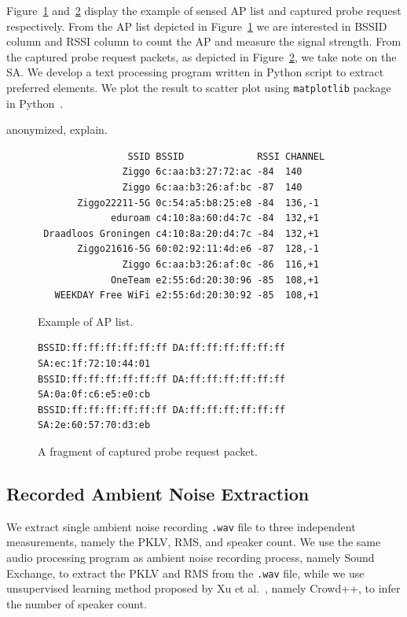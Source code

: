 Figure~\ref{fig:ap-list-example} and~\ref{fig:probe-request-example} display the example of sensed \ac{AP} list and captured probe request respectively. From the \ac{AP} list depicted in Figure~\ref{fig:ap-list-example} we are interested in \ac{BSSID} column and \ac{RSSI} column to count the \ac{AP} and measure the signal strength. From the captured probe request packets, as depicted in Figure~\ref{fig:probe-request-example}, we take note on the \ac{SA}. We develop a text processing program written in Python script to extract preferred elements. We plot the result to scatter plot using \verb|matplotlib| package in Python~\cite{Hunter:2007}.


anonymized, explain.

\begin{figure}[ht]
	\centering
\begin{verbatim}
                SSID BSSID             RSSI CHANNEL 
               Ziggo 6c:aa:b3:27:72:ac -84  140     
               Ziggo 6c:aa:b3:26:af:bc -87  140     
       Ziggo22211-5G 0c:54:a5:b8:25:e8 -84  136,-1  
             eduroam c4:10:8a:60:d4:7c -84  132,+1  
 Draadloos Groningen c4:10:8a:20:d4:7c -84  132,+1  
       Ziggo21616-5G 60:02:92:11:4d:e6 -87  128,-1  
               Ziggo 6c:aa:b3:26:af:0c -86  116,+1  
             OneTeam e2:55:6d:20:30:96 -85  108,+1  
   WEEKDAY Free WiFi e2:55:6d:20:30:92 -85  108,+1  
\end{verbatim}
	\caption{Example of \ac{AP} list.}
	\label{fig:ap-list-example}
\end{figure}

\begin{figure}[ht]
\centering
\begin{verbatim}
BSSID:ff:ff:ff:ff:ff:ff DA:ff:ff:ff:ff:ff:ff SA:ec:1f:72:10:44:01
BSSID:ff:ff:ff:ff:ff:ff DA:ff:ff:ff:ff:ff:ff SA:0a:0f:c6:e5:e0:cb
BSSID:ff:ff:ff:ff:ff:ff DA:ff:ff:ff:ff:ff:ff SA:2e:60:57:70:d3:eb
\end{verbatim}
\caption{A fragment of captured probe request packet.}
\label{fig:probe-request-example}
\end{figure}

\subsection{Recorded Ambient Noise Extraction} %
\label{sub:recorded_ambient_noise_extraction}
We extract single ambient noise recording \verb|.wav| file to three independent measurements, namely the \ac{PKLV}, \ac{RMS}, and speaker count. We use the same audio processing program as ambient noise recording process, namely Sound Exchange, to extract the \ac{PKLV} and \ac{RMS} from the \verb|.wav| file, while we use unsupervised learning method proposed by Xu et al.~\cite{thesis067}, namely Crowd++, to infer the number of speaker count.

